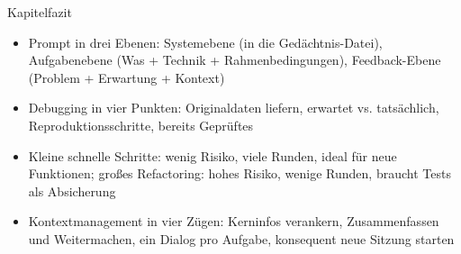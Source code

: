 \begin{tcbsummary}{Kapitelfazit}
\begin{itemize}
  \item Prompt in drei Ebenen: Systemebene (in die Gedächtnis-Datei), Aufgabenebene (Was + Technik + Rahmenbedingungen), Feedback-Ebene (Problem + Erwartung + Kontext)
  \item Debugging in vier Punkten: Originaldaten liefern, erwartet vs. tatsächlich, Reproduktionsschritte, bereits Geprüftes
  \item Kleine schnelle Schritte: wenig Risiko, viele Runden, ideal für neue Funktionen; großes Refactoring: hohes Risiko, wenige Runden, braucht Tests als Absicherung
  \item Kontextmanagement in vier Zügen: Kerninfos verankern, Zusammenfassen und Weitermachen, ein Dialog pro Aufgabe, konsequent neue Sitzung starten
\end{itemize}

\end{tcbsummary}
